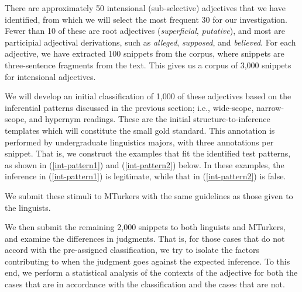 \documentclass[10pt]{article}
\begin{document}
There are approximately 50 intensional (sub-selective) adjectives that we have identified, from which we will select the most frequent 30 for our investigation. Fewer than 10 of these are root adjectives ({\it superficial}, {\it putative}), and most are participial adjectival derivations, such as {\it alleged}, {\it supposed}, and {\it believed}. For each adjective, we have extracted 100 snippets from the corpus, where snippets are three-sentence fragments from the text. This gives us a corpus of 3,000 snippets for intensional adjectives. 

We will develop an initial classification of 1,000 of these adjectives based on the inferential patterns discussed in the previous section; i.e., wide-scope, narrow-scope, and hypernym readings. 
These are the initial structure-to-inference templates which will constitute the small gold standard. This annotation is performed by undergraduate linguistics majors, with three annotations per snippet. 
That is, we construct the examples that fit the identified test patterns, as shown in (\ref{int-pattern1}) and (\ref{int-pattern2}) below. In these examples, the inference in (\ref{int-pattern1}) is legitimate, while that in (\ref{int-pattern2}) is false. 



 \noindent We submit these stimuli to MTurkers  with the same guidelines as those given to the linguists. 
 
 We then submit the remaining 2,000 snippets to both linguists and MTurkers, and examine the differences in judgments. That is, for those cases that do not accord with the pre-assigned classification, we try to isolate the factors contributing to when the judgment goes against the expected inference. 
 To this end, we perform a statistical analysis of the contexts of the adjective for both the cases that are in accordance with the classification and the cases that are not. 
 
\end{document}
